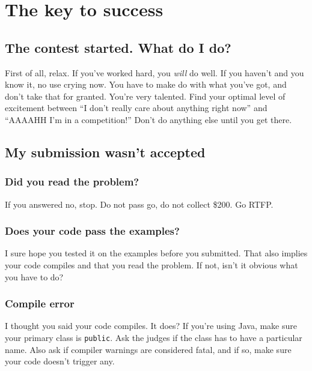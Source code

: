 \documentclass[a4paper,12pt]{article}
\begin{document}
\newpage\section{The key to success}

\subsection{The contest started. What do I do?}
First of all, relax. If you've worked hard, you {\em will} do well. If you haven't and you know it, no use crying now. You have to make do with what you've got, and don't take that for granted. You're very talented. Find your optimal level of excitement between ``I don't really care about anything right now'' and ``AAAAHH I'm in a competition!'' Don't do anything else until you get there. 

\subsection{My submission wasn't accepted}

\subsubsection{Did you read the problem?}
If you answered no, stop. Do not pass go, do not collect \$200. Go RTFP.

\subsubsection{Does your code pass the examples?}
I sure hope you tested it on the examples before you submitted. That also implies your code compiles and that you read the problem. If not, isn't it obvious what you have to do?

\subsubsection{Compile error}
I thought you said your code compiles. It does? If you're using Java, make sure your primary class is \lstinline/public/. Ask the judges if the class has to have a particular name. Also ask if compiler warnings are considered fatal, and if so, make sure your code doesn't trigger any.
\end{document}
